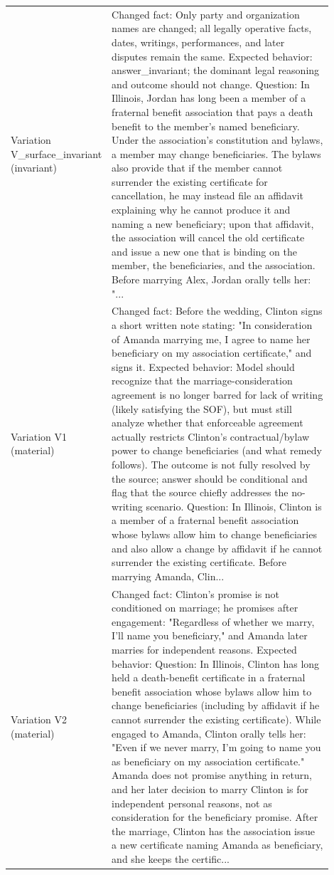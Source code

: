 \begin{longtable}{p{0.18\linewidth}p{0.72\linewidth}}
Variation V\_surface\_invariant (invariant) & Changed fact: Only party and organization names are changed; all legally operative facts, dates, writings, performances, and later disputes remain the same. Expected behavior: answer\_invariant; the dominant legal reasoning and outcome should not change. Question: In Illinois, Jordan has long been a member of a fraternal benefit association that pays a death benefit to the member's named beneficiary. Under the association's constitution and bylaws, a member may change beneficiaries. The bylaws also provide that if the member cannot surrender the existing certificate for cancellation, he may instead file an affidavit explaining why he cannot produce it and naming a new beneficiary; upon that affidavit, the association will cancel the old certificate and issue a new one that is binding on the member, the beneficiaries, and the association. Before marrying Alex, Jordan orally tells her: "... \\
Variation V1 (material) & Changed fact: Before the wedding, Clinton signs a short written note stating: "In consideration of Amanda marrying me, I agree to name her beneficiary on my association certificate," and signs it. Expected behavior: Model should recognize that the marriage-consideration agreement is no longer barred for lack of writing (likely satisfying the SOF), but must still analyze whether that enforceable agreement actually restricts Clinton's contractual/bylaw power to change beneficiaries (and what remedy follows). The outcome is not fully resolved by the source; answer should be conditional and flag that the source chiefly addresses the no-writing scenario. Question: In Illinois, Clinton is a member of a fraternal benefit association whose bylaws allow him to change beneficiaries and also allow a change by affidavit if he cannot surrender the existing certificate. Before marrying Amanda, Clin... \\
Variation V2 (material) & Changed fact: Clinton's promise is not conditioned on marriage; he promises after engagement: "Regardless of whether we marry, I'll name you beneficiary," and Amanda later marries for independent reasons. Expected behavior: Question: In Illinois, Clinton has long held a death-benefit certificate in a fraternal benefit association whose bylaws allow him to change beneficiaries (including by affidavit if he cannot surrender the existing certificate). While engaged to Amanda, Clinton orally tells her: "Even if we never marry, I'm going to name you as beneficiary on my association certificate." Amanda does not promise anything in return, and her later decision to marry Clinton is for independent personal reasons, not as consideration for the beneficiary promise. After the marriage, Clinton has the association issue a new certificate naming Amanda as beneficiary, and she keeps the certific... \\
\bottomrule
\end{longtable}

